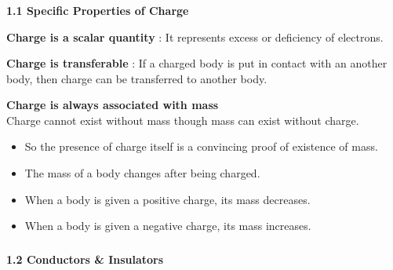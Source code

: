 
\begin{frame}[t]
\frametitle{}

\renewcommand{\familydefault}{\rmdefault}


\noindent
\textbf{1.1 Specific Properties of Charge}

\vspace{0.7em}

\item<+-> \textbf{Charge is a scalar quantity} : It represents excess or deficiency of electrons.

    \vspace{0.5em}
    \pause
    \item<+-> \textbf{Charge is transferable} : If a charged body is put in contact with an another body, then charge can be transferred to another body.

    \vspace{0.5em}
    \pause
    \item<+-> \textbf{Charge is always associated with mass} \\
    Charge cannot exist without mass though mass can exist without charge.
    
    \vspace{0.3em}
    \begin{itemize}
        \item<+-> So the presence of charge itself is a convincing proof of existence of mass.
        \item<+-> The mass of a body changes after being charged.
        \item<+-> When a body is given a positive charge, its mass decreases.
        \item<+-> When a body is given a negative charge, its mass increases.
\end{itemize}

\begin{frame}[t]
\frametitle{}

\noindent
\textbf{1.2 Conductors \& Insulators}


\end{frame}
\end{frame}

